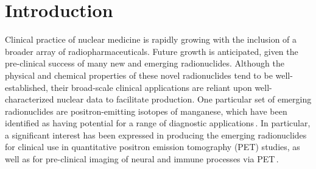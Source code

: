 
\section{\label{sec:intro_fe}Introduction}



Clinical practice of nuclear medicine is rapidly growing with the inclusion of a broader array of radiopharmaceuticals. 
Future growth is anticipated, given the pre-clinical success of many  new and emerging radionuclides. 
Although the physical and chemical properties of these novel radionuclides tend to be
well-established, their broad-scale  clinical applications are reliant upon well-characterized nuclear data to facilitate 
production. 
% 
% 
% 
One particular set of  emerging radionuclides are 
positron-emitting isotopes of manganese, which have been identified as having potential for a range of diagnostic applications\,\cite{J.2013,Graves2015,Lewis2015,PhysRevC.96.014613,Wooten2017,Hernandez2017}.
In particular, a significant interest has been expressed in producing the emerging radionuclides  for clinical use in quantitative positron emission tomography (PET) studies, as well as   for pre-clinical imaging of neural and immune processes via PET\,\cite{Graves2016}. 




